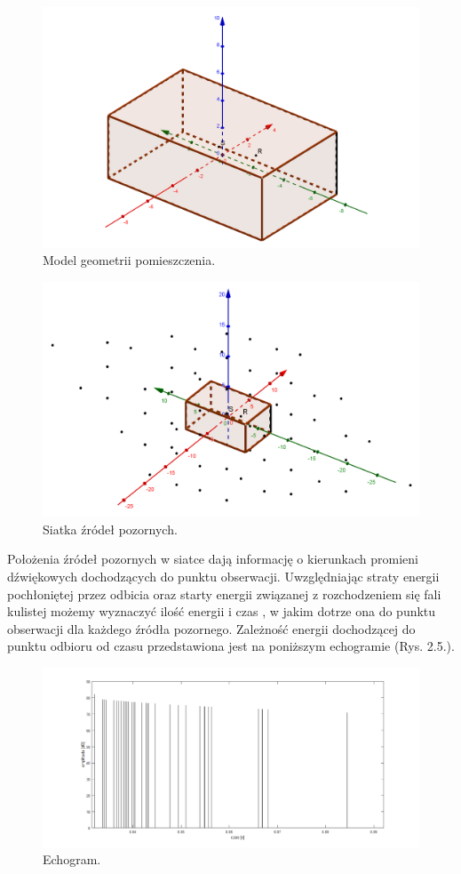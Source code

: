 \begin{figure}[h]
        \centering
                \centering
                \includegraphics[width=12cm]{rys3}
	\caption{Model geometrii pomieszczenia.}
\end{figure}

\begin{figure}[h]
        \centering
                \centering
                \includegraphics[width=12cm]{rys4}
	\caption{Siatka źródeł pozornych.}
\end{figure}

Położenia  źródeł pozornych w siatce dają informację o kierunkach promieni dźwiękowych dochodzących do punktu obserwacji. Uwzględniając straty energii pochłoniętej przez odbicia oraz starty energii związanej z rozchodzeniem się fali kulistej możemy wyznaczyć  ilość energii i czas , w jakim dotrze ona do punktu obserwacji dla każdego źródła pozornego. Zależność energii dochodzącej do punktu odbioru od czasu przedstawiona jest na poniższym echogramie (Rys. 2.5.).

\begin{figure}[h]
        \centering
                \centering
                \includegraphics[width=12cm]{rys5}
	\caption{Echogram.}
\end{figure}

